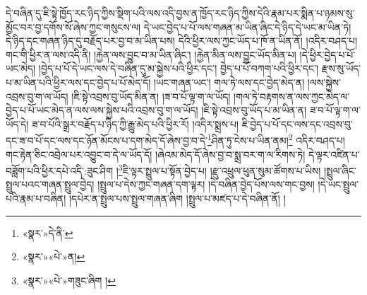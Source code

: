 དེ་བཞིན་དུ་ཇི་སྟེ་ཁྱོད་རང་ཉིད་ཀྱིས་སྡིག་པའི་ལས་འདི་བྱས་ན་ཁྱོད་རང་ཉིད་ཀྱིས་དེའི་རྣམ་པར་སྨིན་པ་ཉམས་སུ་མྱོང་བར་བྱ་དགོས་སོ་ཞེས་ཀྱང་གསུངས་ལ། དེ་ཡང་བྱེད་པ་པོ་ལས་གཞན་མ་ཡིན་ཞིང་དེ་ཉིད་དེ་ཡང་མ་ཡིན་ཏེ། དེ་ཉིད་དང་གཞན་ཉིད་དུ་བརྗོད་པར་བྱ་བ་མ་ཡིན་པས། དེའི་ཕྱིར་ལས་ཀྱང་ཡོད་པ་ཁོ་ན་ཡིན་ནོ། །འདིར་བཤད་པ། གང་གི་ཕྱིར་ན་ལས་འདི་ནི། །རྐྱེན་ལས་བྱུང་བ་མ་ཡིན་ཞིང་། །རྐྱེན་མིན་ལས་བྱུང་ཡོད་མིན་པ། །དེ་ཕྱིར་བྱེད་པ་པོ་ཡང་མེད། །བྱེད་པ་པོ་དེ་ཡང་ལས་དེ་བཞིན་དུ་མ་སྐྱེས་པའི་ཕྱིར་དང་། བྱེད་པ་པོ་བཀག་པའི་ཕྱིར་དང་། རྫས་སུ་ཡོད་པ་མ་ཡིན་པའི་ཕྱིར་ལས་དང་བྱེད་པ་པོ་མེད་དོ། །ཡང་གཞན་ཡང་། གལ་ཏེ་ལས་དང་བྱེད་མེད་ན། །ལས་སྐྱེས་འབྲས་བུ་ག་ལ་ཡོད། །ཇི་སྟེ་འབྲས་བུ་ཡོད་མིན་ན། །ཟ་བ་པོ་ལྟ་ག་ལ་ཡོད། །གལ་ཏེ་བརྟགས་ན་ལས་ཀྱང་མེད་ལ་བྱེད་པ་པོ་ཡང་མེད་ན་ལས་ལས་སྐྱེས་པའི་འབྲས་བུ་ག་ལ་ཡོད། །ཇི་སྟེ་འབྲས་བུ་ཡོད་པ་མ་ཡིན་ན། ཟ་བ་པོ་ལྟ་ག་ལ་ཡོད་དེ། ཟ་བ་པོའི་སྒྲར་བརྗོད་པ་ཉིད་ཀྱི་རྒྱུ་མེད་པའི་ཕྱིར་རོ། །འདིར་སྨྲས་པ། ཇི་བྱེད་པ་པོ་དང་ལས་དང་འབྲས་བུ་དང་ཟ་བ་པོ་དང་ལས་དང་ཉོན་མོངས་པ་དག་མེད་དོ་ཞེས་བྱ་བ་དེ་\footnote{«སྣར་»དེ་ནི་}ཤིན་ཏུ་ངེས་པ་ཡིན་ནམ།\footnote{«སྣར་»«པེ་»ན།} འདིར་བཤད་པ། གང་རྟེན་ཅིང་འབྲེལ་པར་འབྱུང་བ་དེ་ལ་ཡོད་དོ། །ཞེའམ་མེད་དོ་ཞེས་བྱ་བ་སྨྲ་བར་ག་ལ་རིགས་ཏེ། དེ་ལྟར་འཛིན་པ་བཟློག་པའི་ཕྱིར་དཔེ་འདི་:ཟུང་ཤིག །\footnote{«སྣར་»«པེ་»གཟུང་ཞིག །}ཇི་ལྟར་སྤྲུལ་པ་སྟོན་བྱེད་པ། །རྫུ་འཕྲུལ་ཕུན་སུམ་ཚོགས་པ་ཡིས། །སྤྲུལ་ཞིང་སྤྲུལ་པའང་གཞན་སྤྲུལ་བྱེད། །སྤྲུལ་པ་དེས་ཀྱང་གཞན་དག་ལྟར། །དེ་བཞིན་བྱེད་པོས་ལས་གང་བྱས། །དེ་ཡང་སྤྲུལ་པའི་རྣམ་པ་བཞིན། །དཔེར་ན་སྤྲུལ་པས་སྤྲུལ་གཞན་ཞིག །སྤྲུལ་པ་མཛད་པ་དེ་བཞིན་ནོ། །
